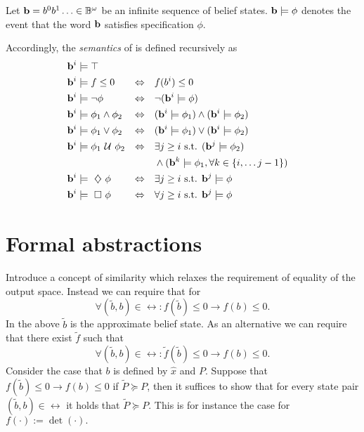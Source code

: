 \documentclass{ifacconf}
\begin{document}
    \begin{definition}
    \label{def:gdtl-semantics}
    Let $\mathbf{b} = b^0b^1 \ldots \in \mathbb{B}^{\omega}$
    be an infinite sequence of belief states. $\mathbf{b} \models \phi$ denotes the event that the word $\mathbf{b}$ satisfies specification $\phi$.
    
     Accordingly, the {\em semantics} of \DTL is defined recursively as
    \begin{align*}
    &\BF{b}^i \models  \top  & \\
    &\BF{b}^i \models f \leq 0 & \Equiv\quad & f(b^i) \leq 0\\ %
    &\BF{b}^i \models \notltl \phi & \Equiv\quad & \notltl (\BF{b}^i \models \phi) \\
    &\BF{b}^i \models \phi_1 \andltl  \phi_2  & \Equiv\quad & ( \BF{b}^i \models \phi_1 ) \andltl ( \BF{b}^i \models \phi_2 ) \\
    &\BF{b}^i \models \phi_1 \orltl  \phi_2  & \Equiv\quad & ( \BF{b}^i \models \phi_1 ) \orltl ( \BF{b}^i \models \phi_2 ) \\
    &\BF{b}^i \models  \phi_1 \Until \phi_2 & \Equiv\quad & \exists j \geq i \text{ s.t. } ( \BF{b}^j \models \phi_2 ) \\
    & & & \andltl (\BF{b}^k \models \phi_1, \forall k \in \{i, \ldots j-1\})\\
    &\BF{b}^i \models \Event \phi  & \Equiv\quad & \exists j \geq i \text{ s.t. } \BF{b}^j \models \phi \\
    &\BF{b}^i \models \Always \phi  & \Equiv\quad & \forall j \geq i \text{ s.t. } \BF{b}^j \models \phi
    \end{align*}
    
    \end{definition}



\section{Formal abstractions}

 Introduce a concept of similarity which relaxes the requirement of equality of the output space. 
 Instead we can  require that for 
 \[\forall (\tilde b,b)\in \rel: f(\tilde b)\leq 0\rightarrow f( b)\leq 0.\]
In the above  $\tilde b$ is the approximate belief state. 
As an alternative we can require that there exist  $\tilde f$ such that
 \[\forall (\tilde b,b)\in \rel: \tilde f(\tilde b)\leq 0\rightarrow f( b)\leq 0.\]
  Consider the case that $b$ is defined by $\hat x$ and $P$. Suppose that  
 $f(\tilde b)\leq 0\rightarrow f( b)\leq 0$ if  $\tilde P\succeq P$, then it suffices to show that
 for every state pair  $ (\tilde b,b)\in \rel$ it holds that $\tilde P\succeq P$. This is for instance the case for $f(\cdot):=\det(\cdot).$
 
\end{document}
